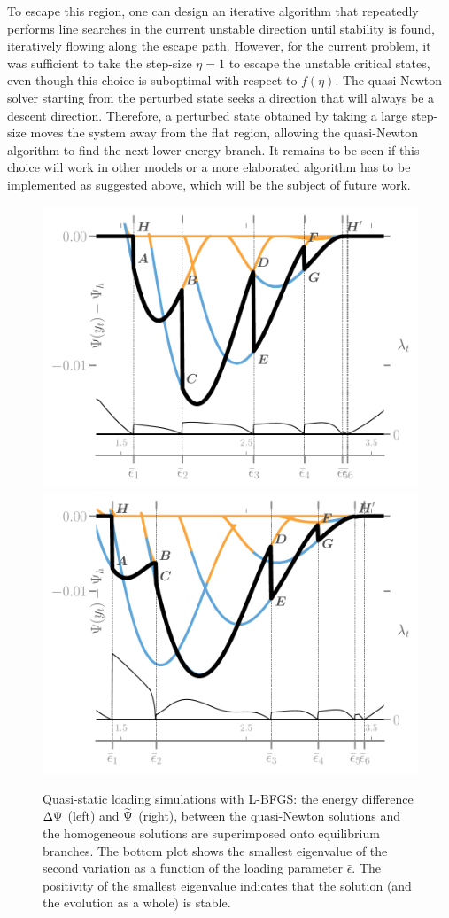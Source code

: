 To escape this region, one can design an iterative algorithm that repeatedly performs line searches in the current unstable direction until stability is found, iteratively flowing along the escape path. However, for the current problem, it was sufficient to take the step-size \( \eta=1 \) to escape the unstable critical states, even though this choice is suboptimal {with respect to} \( f(\eta) \). 
The quasi-Newton solver starting from the perturbed state seeks a direction that will always be a descent direction. Therefore, a perturbed state obtained by taking a large step-size moves the system away from the flat region, allowing the quasi-Newton algorithm to find the next lower energy branch. It remains to be seen if this choice will work in other models or a more elaborated algorithm has to be implemented as suggested above, which will be the subject of future work.

\begin{figure}
    \hspace*{-.3cm}
    \includegraphics[width=.5\textwidth]{../images/model_stiff_energy_kick_algo.pdf} 
    \includegraphics[width=.5\textwidth]{../images/model_compliant_energy_kick_algo.pdf}
    \caption{
        Quasi-static loading simulations with L-BFGS: the energy difference $\Delta \Psi$ (left) and $\widetilde\Psi$ (right), between the quasi-Newton solutions and the homogeneous solutions are superimposed onto equilibrium branches. The bottom plot shows the smallest eigenvalue of the second variation as a function of the loading parameter $\bar\epsilon$. The positivity of the smallest eigenvalue indicates that the solution (and the evolution as a whole) is stable.
        }
    \label{fig:tempostable}
\end{figure}


